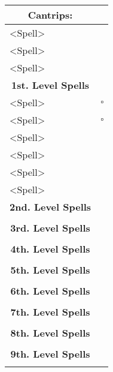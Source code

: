 \documentclass[11pt]{article}
\newcommand{\done}{\rlap{$\square$}{\raisebox{2pt}{\large\hspace{1pt}\ding{51}}}}
\newcommand{\available}{$\square$}
\begin{document}
	\begin{tabularx}{\textwidth}{X|r}
\multicolumn{1}{c|}{\large \textbf{Cantrips}:} & \\
\hline
<Spell> 										& 	\\
<Spell> 										& 	\\
<Spell>		 									&	\\

\multicolumn{1}{c|}{\large \textbf{1st. Level Spells}} & \\
\hline
<Spell>			 								& \available \\
<Spell> 										& \available \\
<Spell>											& \done \\
<Spell> 										& \done \\
<Spell>				 							& \done \\
<Spell> 										& \done \\

\multicolumn{1}{c|}{\large \textbf{2nd. Level Spells}} &	\\
\hline
												&	\\

\multicolumn{1}{c|}{\large \textbf{3rd. Level Spells}} & \\
\hline
 												&  	\\

\multicolumn{1}{c|}{\large \textbf{4th. Level Spells}} & \\
\hline
 												&  	\\

\multicolumn{1}{c|}{\large \textbf{5th. Level Spells}} & \\
\hline
	 											&  	\\

\multicolumn{1}{c|}{\large \textbf{6th. Level Spells}} & \\
\hline
	 											&  	\\

\multicolumn{1}{c|}{\large \textbf{7th. Level Spells}} & \\
\hline
	 											&  	\\

\multicolumn{1}{c|}{\large \textbf{8th. Level Spells}} & \\
\hline
	 											&  	\\

\multicolumn{1}{c|}{\large \textbf{9th. Level Spells}} & \\
\hline
	 											&
	\end{tabularx}
\end{document}
